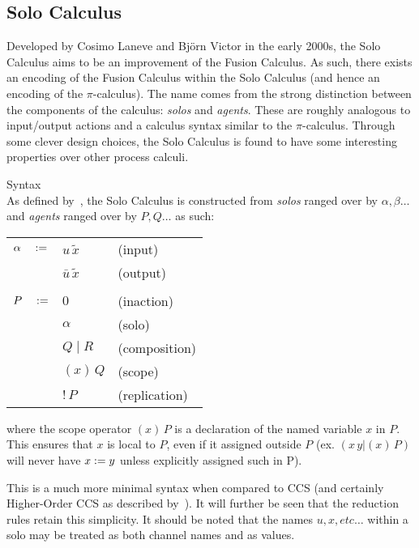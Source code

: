 \subsection{Solo Calculus}

    Developed by Cosimo Laneve and Bj{\"o}rn Victor in the early 2000s, the Solo Calculus aims to be an improvement of the Fusion Calculus.
    As such, there exists an encoding of the Fusion Calculus within the Solo Calculus (and hence an encoding of the $\pi$-calculus).
    The name comes from the strong distinction between the components of the calculus: \textit{solos} and \textit{agents}.
    These are roughly analogous to input/output actions and a calculus syntax similar to the $\pi$-calculus.
    Through some clever design choices, the Solo Calculus is found to have some interesting properties over other process calculi.

    \begin{definition}{Syntax\\}
        \label{solo-calculus-syntax}
        As defined by~\cite{solo-calculus}, the Solo Calculus is constructed from \textit{solos} ranged over by $\alpha, \beta \ldots$ and \textit{agents} ranged over by $P, Q \ldots$ as such:
        \begin{center}
            \begin{tabular}{ l l l }
                $\alpha \quad :=$   & $u \, \tilde{x}$          & (input) \\
                                        & $\bar{u} \, \tilde{x}$    & (output)~\footnotemark\\ \\
                $P \quad :=$        & $0$                       & (inaction) \\
                                        & $\alpha$                  & (solo) \\
                                        & $Q \; | \; R$             & (composition) \\
                                        & $(x) \, Q$                & (scope) \\
                                        & $!\,P$                    & (replication)
            \end{tabular}
        \end{center}
        where the scope operator $(x) \, P $ is a declaration of the named variable $x$ in $P$.
        This ensures that $x$ is local to $P$, even if it assigned outside $P$ (ex. $(x \, y | (x) \, P)$ will never have $x := y$ unless explicitly assigned such in P).
    \end{definition}
    This is a much more minimal syntax when compared to CCS (and certainly Higher-Order CCS as described by~\cite{pi-calculus-in-ccs}).
    It will further be seen that the reduction rules retain this simplicity.
    It should be noted that the names $u, x, etc\ldots$ within a solo may be treated as both channel names and as values.


